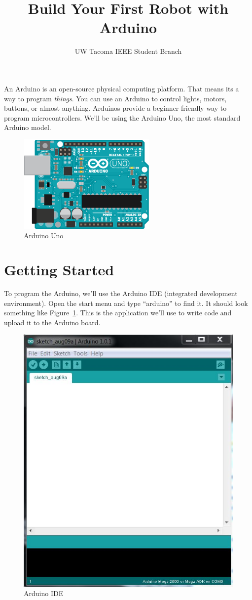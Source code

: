 \documentclass[letterpaper]{article}
\title{Build Your First Robot with Arduino}
\author{UW Tacoma IEEE Student Branch}
\begin{document}
\maketitle

An Arduino is an open-source physical computing platform.
That means its a way to program \emph{things}.
You can use an Arduino to control lights, motors, buttons, or almost anything.
Arduinos provide a beginner friendly way to program microcontrollers.
We'll be using the Arduino Uno,
the most standard Arduino model.

\begin{figure}[h!]
    \center
    \includegraphics[width=.5\textwidth]{uno.png}
    \caption{Arduino Uno}
\end{figure}

\section{Getting Started}
\label{sec:getting_started}

To program the Arduino,
we'll use the Arduino IDE (integrated development environment).
Open the start menu and type ``arduino'' to find it.
It should look something like Figure~\ref{fig:ide}.
This is the application we'll use to write code
and upload it to the Arduino board.

\begin{figure}[h!]
    \center
    \includegraphics[width=.5\textwidth]{ide.jpg}
    \caption{Arduino IDE}
    \label{fig:ide}
\end{figure}
\end{document}
